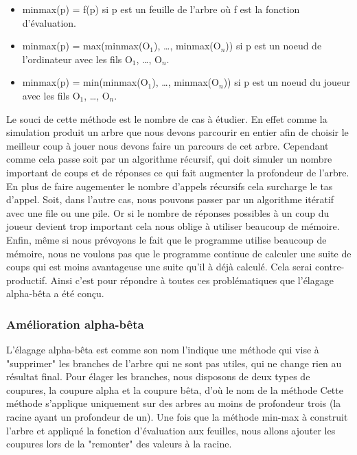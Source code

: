 \documentclass[12pt]{article}
\begin{document}
    	\begin{itemize}
    		\item minmax(p) = f(p) si p est un feuille de l'arbre où f est la fonction d'évaluation.
    		\item minmax(p) = max(minmax(O$_1$), \ldots, minmax(O$_n$)) si p est un noeud de l'ordinateur avec les
    			fils O$_1$, \ldots, O$_n$.
    		\item minmax(p) = min(minmax(O$_1$), \ldots, minmax(O$_n$)) si p est un noeud du joueur avec les fils
    			O$_1$, \ldots, O$_n$.
    	\end{itemize}
    
    	Le souci de cette méthode est le nombre de cas à étudier. En effet comme la simulation
    	produit un arbre que nous devons parcourir en entier afin de choisir le meilleur coup à jouer
    	nous devons faire un parcours de cet arbre. Cependant comme cela passe soit par un algorithme récursif,
    	qui doit simuler un nombre important de coups et de réponses ce qui fait augmenter la profondeur de l'arbre.
    	En plus de faire augementer le nombre d'appels récursifs cela surcharge le tas d'appel. Soit, dans l'autre cas,
    	nous pouvons passer par un algorithme itératif avec une file ou une pile. Or si le nombre de réponses possibles
    	à un coup du joueur devient trop important cela nous oblige à utiliser beaucoup de mémoire. Enfin, même si nous
    	prévoyons le fait que le programme utilise beaucoup de mémoire, nous ne voulons pas que le programme continue de
    	calculer une suite de coups qui est moins avantageuse une suite qu'il à déjà calculé. Cela serai contre-productif.
    	Ainsi c'est pour répondre à toutes ces problématiques que l'élagage alpha-bêta a été conçu.

	\subsubsection{Amélioration alpha-bêta}
    	L'élagage alpha-bêta est comme son nom l'indique une méthode qui vise à "supprimer" les branches de l'arbre qui
    	ne sont pas utiles, qui ne change rien au résultat final. Pour élager les branches, nous disposons de deux types de
    	coupures, la coupure alpha et la coupure bêta, d'où le nom de la méthode\cite{elagage_alpha_beta}
    	Cette méthode s'applique uniquement sur des arbres au moins de profondeur trois
    	(la racine ayant un profondeur de un). Une fois que la méthode min-max à construit l'arbre
    	et appliqué la fonction d'évaluation aux feuilles, nous allons ajouter les coupures lors de la
    	"remonter" des valeurs à la racine.
\end{document}
